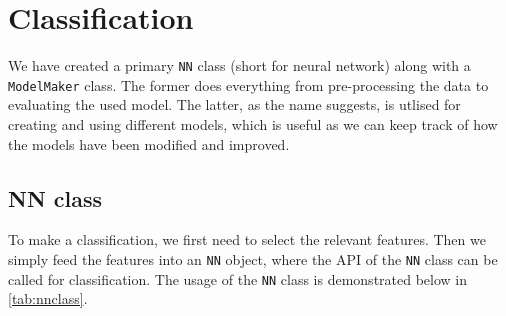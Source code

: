 \section{Classification}
We have created a primary \verb|NN| class (short for neural network) along with a \verb|ModelMaker| class. The former does everything from pre-processing the data to evaluating the used model. The latter, as the name suggests, is utlised for creating and using different models, which is useful as we can keep track of how the models have been modified and improved. 

\subsection{NN class}
To make a classification, we first need to select the relevant features. Then we simply feed the features into an \verb|NN| object, where the API of the \verb|NN| class can be called for classification. The usage of the \verb|NN| class is demonstrated below in \ref{tab:nnclass}.


